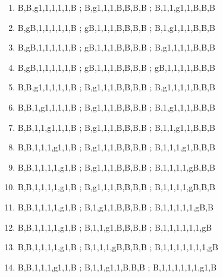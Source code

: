 \documentclass[leqno]{article}
\begin{document}
\begin{enumerate}
                    \item {}         {B,B,g1,1,1,1,1,B ; B,g1,1,1,B,B,B,B ; B,1,1,g1,1,B,B,B}
                    \item {}       {B,gB,1,1,1,1,1,B ; gB,1,1,1,B,B,B,B ; B,1,g1,1,1,B,B,B}
                    \item {}       {B,gB,1,1,1,1,1,B ; gB,1,1,1,B,B,B,B ; B,g1,1,1,1,B,B,B}
                    \item {}      {B,gB,1,1,1,1,1,B ; gB,1,1,1,B,B,B,B ; gB,1,1,1,1,B,B,B}
                    \item {}         {B,B,g1,1,1,1,1,B ; B,g1,1,1,B,B,B,B ; B,g1,1,1,1,B,B,B}
                    \item {}         {B,B,1,g1,1,1,1,B ; B,g1,1,1,B,B,B,B ; B,1,g1,1,1,B,B,B}
                    \item {}         {B,B,1,1,g1,1,1,B ; B,g1,1,1,B,B,B,B ; B,1,1,g1,1,B,B,B}
                    \item {}         {B,B,1,1,1,g1,1,B ; B,g1,1,1,B,B,B,B ; B,1,1,1,g1,B,B,B}
                    \item {}        {B,B,1,1,1,1,g1,B ; B,g1,1,1,B,B,B,B ; B,1,1,1,1,gB,B,B}
                    \item {}        {B,B,1,1,1,1,g1,B ; B,g1,1,1,B,B,B,B ; B,1,1,1,1,gB,B,B}
                    \item {}       {B,B,1,1,1,1,g1,B ; B,1,g1,1,B,B,B,B ; B,1,1,1,1,1,gB,B}
                    \item {}      {B,B,1,1,1,1,g1,B ; B,1,1,g1,B,B,B,B ; B,1,1,1,1,1,1,gB}
                    \item {}    {B,B,1,1,1,1,g1,B ; B,1,1,1,gB,B,B,B ; B,1,1,1,1,1,1,1,gB}
                    \item {}     {B,B,1,1,1,g1,1,B ; B,1,1,g1,1,B,B,B ; B,1,1,1,1,1,1,g1,B}

\end{enumerate}
\end{document}
